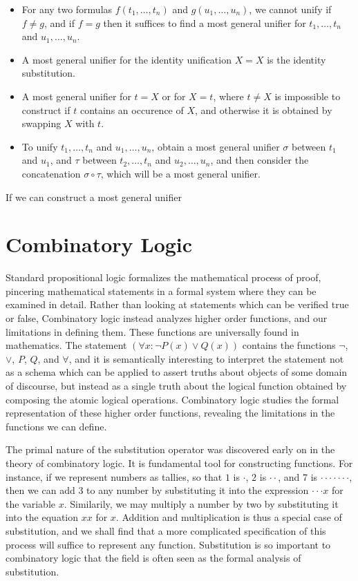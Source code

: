 %
\begin{itemize}
    \item For any two formulas $f(t_1, \dots, t_n)$ and $g(u_1, \dots, u_n)$, we cannot unify if $f \neq g$, and if $f = g$ then it suffices to find a most general unifier for $t_1, \dots, t_n$ and $u_1, \dots, u_n$.
    \item A most general unifier for the identity unification $X = X$ is the identity substitution.
    \item A most general unifier for $t = X$ or for $X = t$, where $t \neq X$ is impossible to construct if $t$ contains an occurence of $X$, and otherwise it is obtained by swapping $X$ with $t$.
    \item To unify $t_1, \dots, t_n$ and $u_1, \dots, u_n$, obtain a most general unifier $\sigma$ between $t_1$ and $u_1$, and $\tau$ between $t_2, \dots, t_n$ and $u_2, \dots, u_n$, and then consider the concatenation $\sigma \circ \tau$, which will be a most general unifier.
\end{itemize}
%
If we can construct a most general unifier 

\chapter{Combinatory Logic}

Standard propositional logic formalizes the mathematical process of proof, pincering mathematical statements in a formal system where they can be examined in detail. Rather than looking at statements which can be verified true or false, Combinatory logic instead analyzes higher order functions, and our limitations in defining them. These functions are universally found in mathematics. The statement $(\forall x: \neg P(x) \vee Q(x))$ contains the functions $\neg$, $\vee$, $P$, $Q$, and $\forall$, and it is semantically interesting to interpret the statement not as a schema which can be applied to assert truths about objects of some domain of discourse, but instead as a single truth about the logical function obtained by composing the atomic logical operations. Combinatory logic studies the formal representation of these higher order functions, revealing the limitations in the functions we can define.

The primal nature of the substitution operator was discovered early on in the theory of combinatory logic. It is fundamental tool for constructing functions. For instance, if we represent numbers as tallies, so that $1$ is $\cdot$, $2$ is $\cdot \cdot$, and 7 is $\cdot \cdot \cdot \cdot \cdot \cdot \cdot$, then we can add 3 to any number by substituting it into the expression $\cdot \cdot \cdot x$ for the variable $x$. Similarily, we may multiply a number by two by substituting it into the equation $xx$ for $x$. Addition and multiplication is thus a special case of substitution, and we shall find that a more complicated specification of this process will suffice to represent any function. Substitution is so important to combinatory logic that the field is often seen as the formal analysis of substitution.

